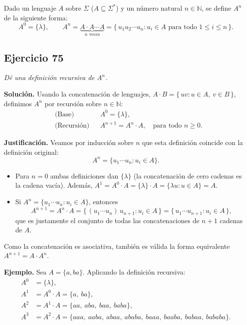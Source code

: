 
\noindent Dado un lenguaje $A$ sobre $\Sigma$ ($A \subseteq \Sigma^*$) y un número
natural $n \in \mathbb{N}$, se define $A^n$ de la siguiente forma:
\[
A^0 = \{\lambda\}, \qquad
A^n = \underbrace{A \cdot A \cdots A}_{n \text{ veces}}
= \{\, u_1 u_2 \cdots u_n : u_i \in A \text{ para todo } 1 \leq i \leq n \,\}.
\]

\subsection*{Ejercicio 75}

\noindent\textit{Dé una definición recursiva de $A^n$.}

\medskip
\noindent\textbf{Solución.} Usando la concatenación de lenguajes,
$A \cdot B = \{\, uv : u \in A,\ v \in B \,\}$, definimos $A^n$ por recursión sobre
$n \in \mathbb{N}$:
\[
\boxed{
    \begin{aligned}
        &\text{(Base)}      && A^0 = \{\lambda\}, \\
        &\text{(Recursión)} && A^{n+1} = A^n \cdot A, \quad \text{para todo } n \geq 0 .
\end{aligned}}
\]

\medskip
\noindent\textbf{Justificación.} Veamos por inducción sobre $n$ que esta definición
coincide con la definición original:
\[
A^n = \{u_1 \cdots u_n : u_i \in A\}.
\]

\begin{itemize}
    \item Para $n = 0$ ambas definiciones dan $\{\lambda\}$ (la concatenación de cero
    cadenas es la cadena vacía). Además,
    $A^1 = A^0 \cdot A = \{\lambda\} \cdot A = \{\lambda u : u \in A\} = A$.
    \item Si $A^n = \{u_1 \cdots u_n : u_i \in A\}$, entonces
    \[
    A^{n+1} = A^n \cdot A
    = \{\, (u_1 \cdots u_n)\,u_{n+1} : u_i \in A \,\}
    = \{\, u_1 \cdots u_{n+1} : u_i \in A \,\},
    \]
    que es justamente el conjunto de todas las concatenaciones de $n+1$ cadenas
    de $A$.
\end{itemize}

\noindent Como la concatenación es asociativa, también es válida la forma
equivalente $A^{n+1} = A \cdot A^n$.

\medskip
\noindent\textbf{Ejemplo.} Sea $A = \{a, ba\}$. Aplicando la definición recursiva:
\begin{align*}
    A^0 &= \{\lambda\}, \\
    A^1 &= A^0 \cdot A = \{a,\ ba\}, \\
    A^2 &= A^1 \cdot A = \{aa,\ aba,\ baa,\ baba\}, \\
    A^3 &= A^2 \cdot A = \{aaa,\ aaba,\ abaa,\ ababa,\ baaa,\ baaba,\ babaa,\ bababa\}.
\end{align*}